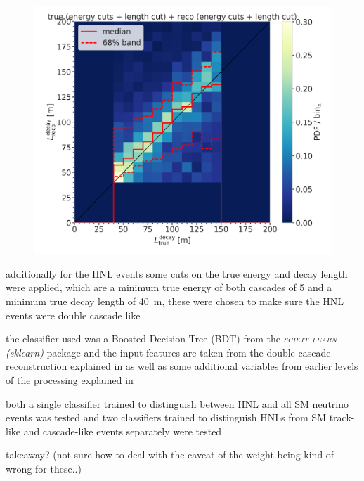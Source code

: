 \begin{figure}[h]
    \centering
    \includegraphics{figures/results/190607/classification/reco_decayL_vs_true_decayL_reco_energy_cut_and_reco_length_cut_and_true_energy_cut_and_true_length_cut_step_contours_weighted.png}
    \caption[]{}
\end{figure}

additionally for the HNL events some cuts on the true energy and decay length were applied, which are a minimum true energy of both cascades of \SI{5}{\gev} and a minimum true decay length of \SI{40}{\meter}, these were chosen to make sure the HNL events were double cascade like


the classifier used was a Boosted Decision Tree (BDT) from the \textit{\textsc{scikit-learn} (sklearn)} package and the input features are taken from the double cascade reconstruction explained in  as well as some additional variables from earlier levels of the processing explained in 


both a single classifier trained to distinguish between HNL and all SM neutrino events was tested and two classifiers trained to distinguish HNLs from SM track-like and cascade-like events separately were tested


takeaway? (not sure how to deal with the caveat of the weight being kind of wrong for these..)


